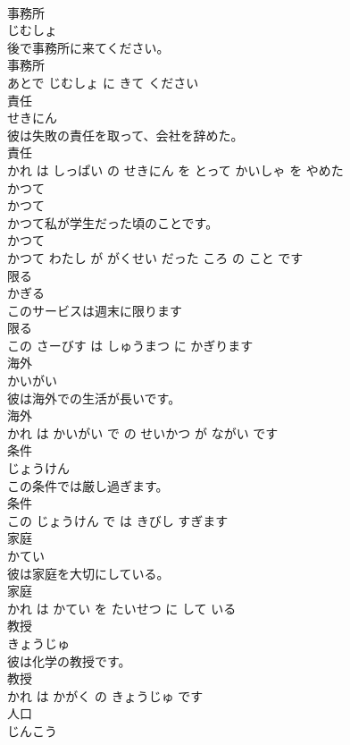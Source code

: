 \documentclass[8pt]{extreport}
\begin{document}
\begin{CJK}{UTF8}{min}
\\	事務所	
\\	じむしょ			
\\	後で事務所に来てください。	
\\	事務所 
\\	あとで じむしょ に きて ください			
\\	責任	
\\	せきにん			
\\	彼は失敗の責任を取って、会社を辞めた。	
\\	責任 
\\	かれ は しっぱい の せきにん を とって かいしゃ を やめた			
\\	かつて	
\\	かつて			
\\	かつて私が学生だった頃のことです。	
\\	かつて 
\\	かつて わたし が がくせい だった ころ の こと です			
\\	限る	
\\	かぎる			
\\	このサービスは週末に限ります	
\\	限る 
\\	この さーびす は しゅうまつ に かぎります			
\\	海外	
\\	かいがい			
\\	彼は海外での生活が長いです。	
\\	海外 
\\	かれ は かいがい で の せいかつ が ながい です			
\\	条件	
\\	じょうけん			
\\	この条件では厳し過ぎます。	
\\	条件 
\\	この じょうけん で は きびし すぎます			
\\	家庭	
\\	かてい			
\\	彼は家庭を大切にしている。	
\\	家庭 
\\	かれ は かてい を たいせつ に して いる			
\\	教授	
\\	きょうじゅ			
\\	彼は化学の教授です。	
\\	教授 
\\	かれ は かがく の きょうじゅ です			
\\	人口	
\\	じんこう			

\end{CJK}
\end{document}
